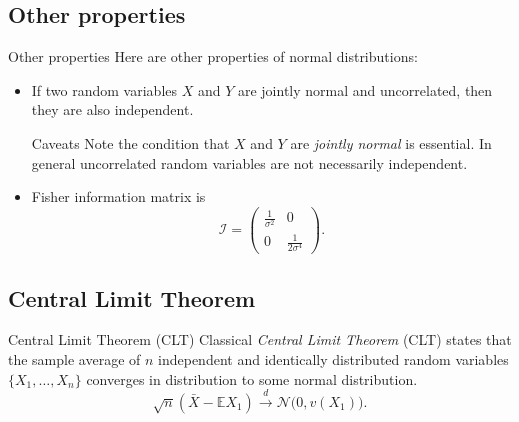 \documentclass{beamer}
\begin{document}
\subsection{Other properties}

\begin{frame}{Other properties}
  Here are other properties of normal distributions:
  \begin{itemize}
  \item<1-> If two random variables \(X\) and \(Y\) are jointly normal and
    uncorrelated, then they are also independent.
    \begin{alertblock}{Caveats}
      Note the condition that \(X\) and \(Y\) are \emph{jointly normal} is
      essential. In general uncorrelated random variables are not necessarily
      independent.
    \end{alertblock}
  \item<2-> Fisher information matrix is
    \begin{equation}
      \mathcal{I} =
      \begin{pmatrix}
        \frac{1}{\sigma^{2}} & 0 \\
        0 & \frac{1}{2\sigma^{4}}
      \end{pmatrix}.
    \end{equation}
  \end{itemize}
\end{frame}

\subsection{Central Limit Theorem}

\begin{frame}{Central Limit Theorem (CLT)}
  Classical \emph{Central Limit Theorem} (CLT) states that the sample average of
  \(n\) independent and identically distributed random variables
  \(\{X_{1}, \ldots, X_{n}\}\) converges in distribution to some normal
  distribution.
  \begin{equation}
    \sqrt{n}\left(\bar{X} - \mathbb{E}X_{1}\right)
    \xrightarrow{d} \mathcal{N}\bigl(0, v(X_{1})\bigr).
  \end{equation}

\end{frame}
\end{document}
